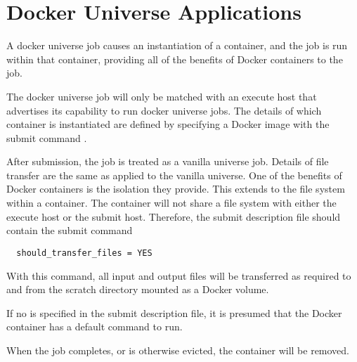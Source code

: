 \section{\label{sec:dockeruniverse}Docker Universe Applications}
A docker universe job causes an instantiation of a container,
and the job is run within that container,
providing all of the benefits of Docker containers to the job.  

The docker universe job will only be matched with an execute host
that advertises its capability to run docker universe jobs.
The details of which container is instantiated are defined by
specifying a Docker image with the submit command
.

After submission, the job is treated as a vanilla universe job.
Details of file transfer are the same as applied to the vanilla universe.
One of the benefits of Docker containers is the isolation they provide.
This extends to the file system within a container.
The container will not share a file system with either the execute
host or the submit host.
Therefore,
the submit description file should contain the submit command
\begin{verbatim}
  should_transfer_files = YES
\end{verbatim}
With this command,  all input and output files will be transferred
as required to and from the scratch directory mounted as a
Docker volume.

If no  is specified in the submit description file,
it is presumed that the Docker container has a default command to run.

When the job completes, or is otherwise evicted,
the container will be removed.

